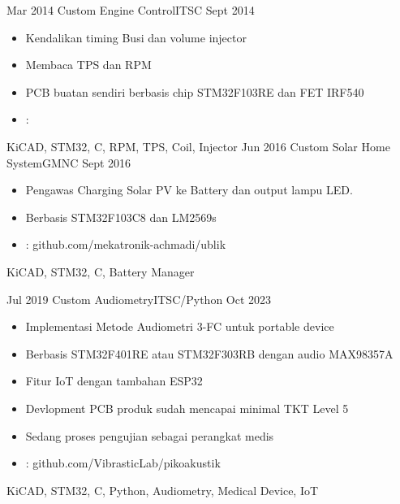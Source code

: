 %
%



\begin{experiences}


	\experience
	{Mar 2014}   {Custom Engine Control}{ITS}{C}
	{Sept 2014} {
	                  \begin{itemize}
	                    \item Kendalikan timing Busi dan volume injector
	                    \item Membaca TPS dan RPM
	                    \item PCB buatan sendiri berbasis chip STM32F103RE dan FET IRF540
	                    \item \faGithub: 
	                  \end{itemize}
	                }
	                {KiCAD, STM32, C, RPM, TPS, Coil, Injector}
	\emptySeparator
	\experience
	{Jun 2016} {Custom Solar Home System}{GMN}{C}
	{Sept 2016}    {
	                  \begin{itemize}
	                    \item Pengawas Charging Solar PV ke Battery dan output lampu LED.
	                    \item Berbasis STM32F103C8 dan LM2569s
	                    \item \faGithub:  {github.com/mekatronik-achmadi/ublik}
	                  \end{itemize}
	                }
	                {KiCAD, STM32, C, Battery Manager}

	\emptySeparator
	\experience
	{Jul 2019} {Custom Audiometry}{ITS}{C/Python}
	{Oct 2023}    {
		\begin{itemize}
			\item Implementasi Metode Audiometri 3-FC untuk portable device
			\item Berbasis STM32F401RE atau STM32F303RB dengan audio MAX98357A
			\item Fitur IoT dengan tambahan ESP32
			\item Devlopment PCB produk sudah mencapai minimal TKT Level 5
			\item Sedang proses pengujian sebagai perangkat medis
			\item \faGithub:  {github.com/VibrasticLab/pikoakustik}
		\end{itemize}
	}
	{KiCAD, STM32, C, Python, Audiometry, Medical Device, IoT}


\end{experiences}

